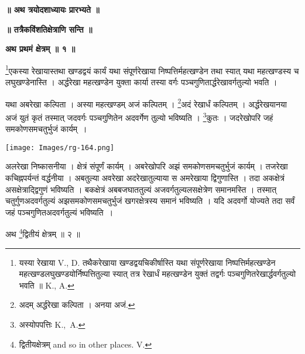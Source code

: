 \documentclass[11pt, openany]{book}
\begin{document}
\newpage
{}
\afterpage{\fancyhead[LE,RO]{\thepage}}
\cfoot{}
\newpage
\newpage
\thispagestyle{empty}
\begin{center}
\textbf{\LARGE ॥ अथ त्रयोदशाध्यायः प्रारभ्यते ॥}
\end{center}
\vspace{3mm}

\begin{center}
\textbf{॥ तत्रैकविंशतिक्षेत्राणि सन्ति ॥}
\vspace{5mm}

 \textbf{\large अथ प्रथमं क्षेत्रम् ॥ १ ॥ }
  \end{center}
  \vspace{2mm}
  
{\ab \renewcommand{\thefootnote}{१}\footnote{यस्या रेखाया {\en V., D.} तथैकरेखाया खण्डद्वयचिकीर्षास्ति यथा
संपूर्णरेखाया निष्पत्तिर्महत्खण्डेन महत्खण्डलघुखण्डयोर्निष्पत्तितुल्या स्यात् तत्र
रेखार्धं महत्खण्डेन युक्तं तद्वर्गः पञ्चगुणितरेखार्द्धवर्गतुल्यो भवति ॥ {\en K., A.} }एकस्या रेखायास्तथा खण्डद्वयं कार्यं यथा संपूर्णरेखाया निष्पत्तिर्महत्खण्डेन तथा स्यात् यथा महत्खण्डस्य च लघुखण्डेनास्ति । अर्द्धरेखा महत्खण्डेन युक्ता कार्या तस्या वर्गः पञ्चगुणितार्द्धरेखावर्गतुल्यो भवति । }\\
\vspace{5mm}


 यथा अबरेखा कल्पिता । अस्या महत्खण्डम् अजं कल्पितम् ।
\renewcommand{\thefootnote}{२}\footnote{अदम् अर्द्धरेखा कल्पिता । अनया अजं.}अदं रेखार्धं कल्पितम् । अर्द्धरेखयानया अजं युतं कृतं तस्मात् जदवर्गः पञ्चगुणितेन अदवर्गेण तुल्यो भविष्यति । \renewcommand{\thefootnote}{३}\footnote{अस्योपपत्तिः {\en K.,~A.}}कुतः ।  जदरेखोपरि जहं समकोणसमचतुर्भुजं कार्यम्~।
\begin{center}
\noindent \texttt{[image: Images/rg-164.png]}  
\end{center}
 अलरेखा निष्कासनीया । क्षेत्रं संपूर्णं कार्यम् । अबरेखोपरि अझं समकोणसमचतुर्भुजं कार्यम् । तजरेखा कचिह्नपर्यन्तं वर्द्धनीया । अबतुल्या अवरेखा अदरेखातुल्याया स अमरेखाया द्विगुणास्ति । तदा अकक्षेत्रं असक्षेत्राद्द्विगुणं भविष्यति । बकक्षेत्रं अबबजघाततुल्यं अजवर्गतुल्यलसक्षेत्रेण समानमस्ति । तस्मात् चतुर्गुणअदवर्गतुल्यं अझसमकोणसमचतुर्भुजं खगरक्षेत्रस्य समानं भविष्यति । यदि अदवर्गो योज्यते तदा सर्वं जहं पञ्चगुणितअदवर्गतुल्यं भविष्यति~। 

\newpage
\begin{center}
 अथ \renewcommand{\thefootnote}{१}\footnote{द्वितीयक्षेत्रम् {\en and so in other places. V.}}द्वितीयं क्षेत्रम् ॥ २ ॥ 
\end{center}
\vspace{2mm}
\end{document}
